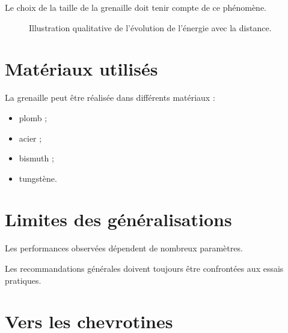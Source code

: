 Le choix de la taille de la grenaille doit tenir compte de ce phénomène.

\begin{figure}[htbp]
\centering


\caption{Illustration qualitative de l'évolution de l'énergie avec la distance.}
\label{fig:energie_grenaille_distance}

\end{figure}

\section{Matériaux utilisés}

La grenaille peut être réalisée dans différents matériaux :

\begin{itemize}
    \item plomb ;
    \item acier ;
    \item bismuth ;
    \item tungstène.
\end{itemize}

\section{Limites des généralisations}

Les performances observées dépendent de nombreux paramètres.

Les recommandations générales doivent toujours être confrontées aux essais
pratiques.

\section{Vers les chevrotines}

